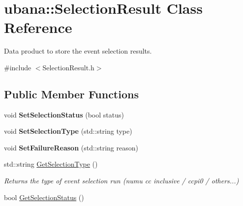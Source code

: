 \hypertarget{classubana_1_1SelectionResult}{\section{ubana\-:\-:Selection\-Result Class Reference}
\label{classubana_1_1SelectionResult}
}


Data product to store the event selection results.  




{\ttfamily \#include $<$Selection\-Result.\-h$>$}

\subsection*{Public Member Functions}
\begin{DoxyCompactItemize}
\item 
\hypertarget{classubana_1_1SelectionResult_a1e042345d4fad423d897c944afb4a2c2}{void {\bfseries Set\-Selection\-Status} (bool status)}\label{classubana_1_1SelectionResult_a1e042345d4fad423d897c944afb4a2c2}

\item 
\hypertarget{classubana_1_1SelectionResult_a44cacfd834cb799f18938de7134c0086}{void {\bfseries Set\-Selection\-Type} (std\-::string type)}\label{classubana_1_1SelectionResult_a44cacfd834cb799f18938de7134c0086}

\item 
\hypertarget{classubana_1_1SelectionResult_ab7053b38033e245ffa2c9ad3c6a4b3dc}{void {\bfseries Set\-Failure\-Reason} (std\-::string reason)}\label{classubana_1_1SelectionResult_ab7053b38033e245ffa2c9ad3c6a4b3dc}

\item 
\hypertarget{classubana_1_1SelectionResult_ac1b21a0690e27bd01ad9ac20afa2d161}{std\-::string \hyperlink{classubana_1_1SelectionResult_ac1b21a0690e27bd01ad9ac20afa2d161}{Get\-Selection\-Type} ()}\label{classubana_1_1SelectionResult_ac1b21a0690e27bd01ad9ac20afa2d161}

\begin{DoxyCompactList}\small\item\em Returns the type of event selection run (numu cc inclusive / ccpi0 / others...) \end{DoxyCompactList}\item 
\hypertarget{classubana_1_1SelectionResult_a2a45390dcb4c138003158a76ac94a8a8}{bool \hyperlink{classubana_1_1SelectionResult_a2a45390dcb4c138003158a76ac94a8a8}{Get\-Selection\-Status} ()}\label{classubana_1_1SelectionResult_a2a45390dcb4c138003158a76ac94a8a8}


\end{DoxyCompactItemize}
